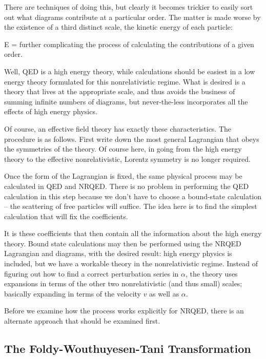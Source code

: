 There are techniques of doing this, but clearly it becomes trickier to easily sort out what diagrams contribute at a particular order.  The matter is made worse by the existence of a third distinct scale, the kinetic energy of each particle: 

\beq  E =  \eeq
further complicating the process of calculating the contributions of a given order.

Well, QED is a high energy theory, while calculations should be easiest in a low energy theory formulated for this nonrelativistic regime.  What is desired is a theory that lives at the appropriate scale, and thus avoids the business of summing infinite numbers of diagrams, but never-the-less incorporates all the effects of high energy physics.

Of course, an effective field theory has exactly these characteristics.  The procedure is as follows.  First write down the most general Lagrangian that obeys the symmetries of the theory.  Of course here, in going from the high energy theory to the effective nonrelativistic, Lorentz symmetry is no longer required.  

Once the form of the Lagrangian is fixed, the same physical process may be calculated in QED and NRQED.  There is no problem in performing the QED calculation in this step because we don't have to choose a bound-state calculation -- the scattering of free particles will suffice.  The idea here is to find the simplest calculation that will fix the coefficients.

It is these coefficients that then contain all the information about the high energy theory.  Bound state calculations may then be performed using the NRQED Lagrangian and diagrams, with the desired result: high energy physics is included, but we have a workable theory in the nonrelativistic regime.  Instead of figuring out how to find a correct perturbation series in $\alpha$, the theory uses expansions in terms of the other two nonrelativistic (and thus small) scales; basically expanding in terms of the velocity $v$ as well as $\alpha$.

Before we examine how the process works explicitly for NRQED, there is an alternate approach that should be examined first.

\subsection{The Foldy-Wouthuyesen-Tani Transformation}

